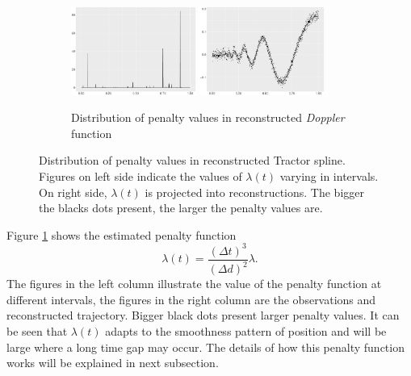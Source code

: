\begin{figure}\ContinuedFloat
    \centering 
    \begin{subfigure}{\textwidth}
    \centering
    \includegraphics[width=0.45\textwidth]{Chapters/02TractorSplineTheory/plot/ggplot/ggDopplerPenaltyBar.pdf}
    \includegraphics[width=0.45\textwidth]{Chapters/02TractorSplineTheory/plot/ggplot/ggDopplerPenaltyLine.pdf}
    \caption{Distribution of penalty values in reconstructed \textit{Doppler} function}
    \end{subfigure}
\caption{Distribution of penalty values in reconstructed Tractor spline. Figures on left side indicate the values of $\lambda(t)$ varying in intervals. On right side, $\lambda(t)$ is projected into reconstructions. The bigger the blacks dots present, the larger the penalty values are.}\label{numpenalty}
 \end{figure}


Figure \ref{numpenalty} shows the estimated penalty function
\begin{equation}
\lambda(t)=\frac{(\Delta t)^3}{(\Delta d)^2}\lambda.
\end{equation}
The figures in the left column illustrate the value of the penalty function at different intervals, the figures in the right column are the observations and reconstructed trajectory. Bigger black dots present larger penalty values. It can be seen that $\lambda(t)$ adapts to the smoothness pattern of position and will be large where a long time gap may occur. The details of how this penalty function works will be explained in next subsection.



